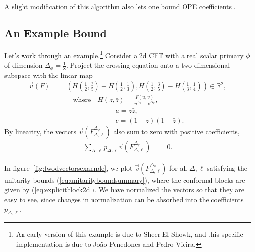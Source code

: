 \documentclass[11pt]{ws-rv9x6}
\newcommand\be{\begin{eqnarray}}
\newcommand\ee{\end{eqnarray}}
\newcommand\f\phi
\newcommand\p[1]{\left(#1\right)}
\newcommand\<\langle
\renewcommand\>\rangle
\newcommand\R{\mathbb{R}}
\newcommand\nn{\nonumber}
\renewcommand\.{\cdot}
\newcommand\De{\Delta}
\begin{document}
A slight modification of this algorithm also lets one bound OPE coefficients \cite{Caracciolo:2009bx}.

\subsection{An Example Bound}
\label{sec:boundsexample}

Let's work through an example.\footnote{An early version of this example is due to Sheer El-Showk, and this specific implementation is due to Jo\~ao Penedones and Pedro Vieira.}  Consider a 2d CFT with a real scalar primary $\f$ of dimension $\De_\f=\frac 1 8$.
Project the crossing equation onto a two-dimensional subspace with the linear map
\be
\label{eq:vecv}
\vec v(F) &=& \p{H\p{\frac 1 2,\frac 3 5} - H\p{\frac 1 2, \frac 1 3}, H\p{\frac 1 2,\frac 3 5} - H\p{\frac 1 3, \frac 1 4}}\in \R^2,\nn\\
&&\quad \textrm{where}\quad H(z,\bar z) = \frac{F(u,v)}{u^{\De_\f}-v^{\De_\f}},\nn\\
&&\qquad \qquad \qquad\,\,\,\,\,\,\, u=z\bar z,\nn\\
&&\qquad \qquad \qquad\,\,\,\,\,\,\, v= (1-z)(1-\bar z).
\ee
By linearity, the vectors $\vec v(F_{\De,\ell}^{\De_\f})$ also sum to zero with positive coefficients,
\be
\label{eq:finitedimensionalcrossing}
\sum_{\De,\ell} p_{\De,\ell} \vec v(F_{\De,\ell}^{\De_\f}) &=& 0.
\ee

In figure~\ref{fig:twodvectorsexample}, we plot $\vec v(F_{\De,\ell}^{\De_\f})$ for all $\De,\ell$ satisfying the unitarity bounds (\ref{eq:unitarityboundsummary}), where the conformal blocks are given by (\ref{eq:explicitblock2d}).  We have normalized the vectors so that they are easy to see, since changes in normalization can be absorbed into the coefficients $p_{\De,\ell}$.
\end{document}
